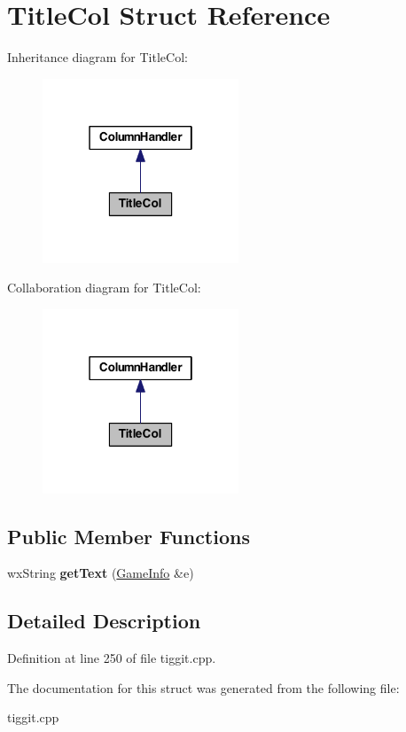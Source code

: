 \hypertarget{struct_title_col}{\section{Title\-Col Struct Reference}
\label{struct_title_col}
}


Inheritance diagram for Title\-Col\-:
\nopagebreak
\begin{figure}[H]
\begin{center}
\leavevmode
\includegraphics[width=166pt]{struct_title_col__inherit__graph}
\end{center}
\end{figure}


Collaboration diagram for Title\-Col\-:
\nopagebreak
\begin{figure}[H]
\begin{center}
\leavevmode
\includegraphics[width=166pt]{struct_title_col__coll__graph}
\end{center}
\end{figure}
\subsection*{Public Member Functions}
\begin{DoxyCompactItemize}
\item 
\hypertarget{struct_title_col_a866c193a5b41be256b38738689f6bcd3}{wx\-String {\bfseries get\-Text} (\hyperlink{struct_game_info}{Game\-Info} \&e)}\label{struct_title_col_a866c193a5b41be256b38738689f6bcd3}

\end{DoxyCompactItemize}


\subsection{Detailed Description}


Definition at line 250 of file tiggit.\-cpp.



The documentation for this struct was generated from the following file\-:\begin{DoxyCompactItemize}
\item 
tiggit.\-cpp\end{DoxyCompactItemize}
